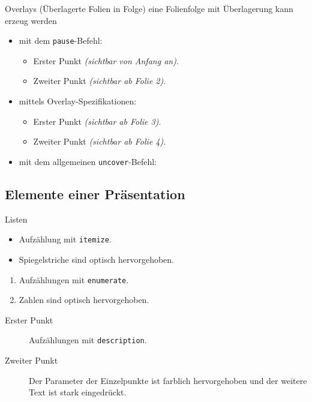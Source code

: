 \documentclass{beamer}
\begin{document}
\begin{frame}{Overlays (\"Uberlagerte Folien in Folge)}
    eine Folienfolge mit \"Uberlagerung kann erzeug werden
    \begin{itemize}
    \item mit dem \texttt{pause}-Befehl:
        \begin{itemize}
        \item Erster Punkt \textsl{(sichtbar von Anfang an)}.
        \pause
        \item Zweiter Punkt \textsl{(sichtbar ab Folie 2)}.
        \end{itemize}
    \item mittels Overlay-Spezifikationen:
        \begin{itemize}
        \item<3-> Erster Punkt \textsl{(sichtbar ab Folie 3)}.
        \item<4-> Zweiter Punkt \textsl{(sichtbar ab Folie 4)}.
        \end{itemize}
    \item mit dem allgemeinen \texttt{uncover}-Befehl:
        \begin{itemize}
        \end{itemize}
    \end{itemize}
\end{frame}

\subsection{Elemente einer Pr\"asentation}
\begin{frame}{Listen}
    \begin{itemize}
    \item Aufz\"ahlung mit \texttt{itemize}.
    \item Spiegelstriche sind optisch hervorgehoben.
    \end{itemize}

    \begin{enumerate}
    \item Aufz\"ahlungen mit \texttt{enumerate}.
    \item Zahlen sind optisch hervorgehoben.
    \end{enumerate}

    \begin{description}
    \item[Erster Punkt] Aufz\"ahlungen mit \texttt{description}.
    \item[Zweiter Punkt] Der Parameter der Einzelpunkte ist farblich hervorgehoben und der weitere Text ist stark eingedr\"uckt.
    \end{description}

\end{frame}
\end{document}
